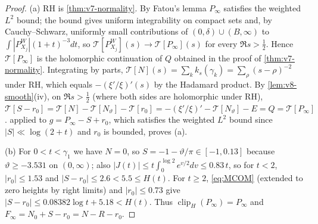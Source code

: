 \documentclass[11pt,a4paper]{article}
\numberwithin{equation}{section}
\theoremstyle{definition}
\theoremstyle{remark}
\newcommand{\clip}{\operatorname{clip}}
\begin{document}
\begin{proof}
(a) RH is \cref{thm:v7-normality}. By Fatou's lemma $P_\infty$
satisfies the weighted $L^2$ bound; the bound gives uniform
integrability on compact sets and, by Cauchy--Schwarz, uniformly small
contributions of $(0,\delta)\cup(B,\infty)$ to
$\int|P_{X_j}^W|(1+t)^{-3}dt$, so $\mathcal T[P_{X_j}^W](s)\to\mathcal T[P_\infty](s)$
for every $\Re s>\frac12$. Hence $\mathcal T[P_\infty]$ is the
holomorphic continuation of $Q$ obtained in the proof of
\cref{thm:v7-normality}. Integrating by parts,
$\mathcal T[N](s)=\sum_kk_s(\gamma_k)=\sum_\rho(s-\rho)^{-2}$ under RH,
which equals $-(\xi'/\xi)'(s)$ by the Hadamard product. By
\cref{lem:v8-smooth}(iv), on $\Re s>\frac12$ (where both sides are
holomorphic under RH),
$\mathcal T[S-r_0]=\mathcal T[N]-\mathcal T[N_\vartheta]-\mathcal T[r_0]
=-(\xi'/\xi)'-\mathcal T[N_\vartheta]-E=Q=\mathcal T[P_\infty]$.
 applied to $g=P_\infty-S+r_0$, which satisfies
the weighted $L^2$ bound since $|S|\ll\log(2+t)$ and $r_0$ is bounded,
proves (a).

(b) For $0<t<\gamma_1$ we have $N=0$, so $S=-1-\vartheta/\pi\in[-1,0.13]$
because $\vartheta\ge-3.531$ on $(0,\infty)$; also
$|J(t)|\le t\int_0^{\log2}e^{v/2}dv\le0.83\,t$, so for $t<2$,
$|r_0|\le1.53$ and $|S-r_0|\le2.6<5.5\le H(t)$. For $t\ge2$,
\eqref{eq:MCOM} (extended to zero heights by right limits) and
$|r_0|\le0.73$ give $|S-r_0|\le0.08382\log t+5.18<H(t)$.
Thus $\clip_H(P_\infty)=P_\infty$ and $F_\infty=N_0+S-r_0=N-R-r_0$.


\end{proof}
\end{document}
